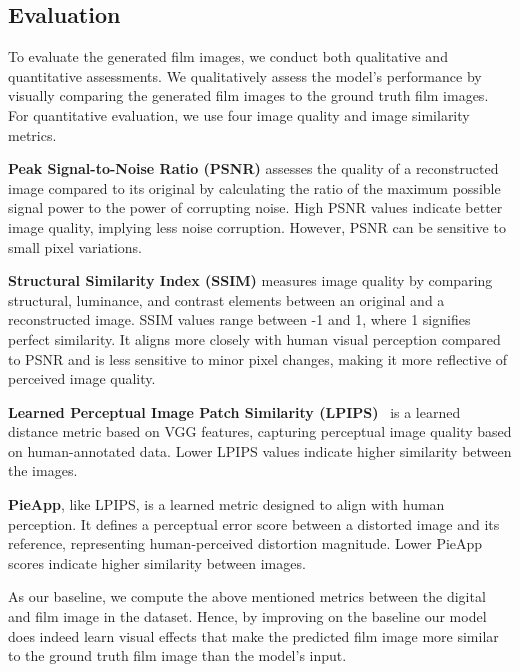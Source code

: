 \subsection{Evaluation}
\label{subsec:evaluation}

To evaluate the generated film images, we conduct both qualitative and
quantitative assessments. We qualitatively assess the model's performance by
visually comparing the generated film images to the ground truth film images.
For quantitative evaluation, we use four image quality and image similarity metrics. 

\textbf{Peak Signal-to-Noise Ratio (PSNR)} assesses the quality of a
reconstructed image compared to its original by calculating the ratio of the
maximum possible signal power to the power of corrupting noise. High PSNR values
indicate better image quality, implying less noise corruption. However, PSNR
can be sensitive to small pixel
variations.

\textbf{Structural Similarity Index (SSIM)} measures image quality by comparing
structural, luminance, and contrast elements between an original and a
reconstructed image. SSIM values range between -1 and 1, where 1 signifies
perfect similarity. It aligns more closely with human visual perception compared
to PSNR and is less sensitive to minor pixel changes, making it more reflective
of perceived image quality.

\textbf{Learned Perceptual Image Patch Similarity (LPIPS)}~\cite{LPIPS} is a
learned distance metric based on VGG features, capturing perceptual image
quality based on human-annotated data. Lower LPIPS values indicate higher
similarity between the images.

\textbf{PieApp}, like LPIPS, is a learned metric designed to align with human
perception. It defines a perceptual error score between a distorted image and
its reference, representing human-perceived distortion magnitude. Lower PieApp
scores indicate higher similarity between images.

As our baseline, we compute the above mentioned metrics between the digital and film image in the dataset. Hence, by improving on the baseline our model does indeed learn visual effects that make the predicted film image more similar to the ground truth film image than the model's input.


